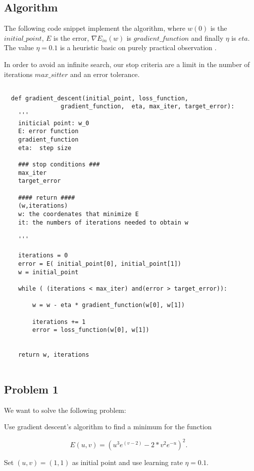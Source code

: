 \subsection{Algorithm}

The following code snippet implement the algorithm, where $w(0)$ is the $initial\_point$, $E$ is the error, $\nabla E_{in}(w)$ is $gradient\_function$ and
finally $\eta$ is $eta.$ The value $\eta = 0.1$ is a heuristic basic on purely practical observation \cite{LFD}.


In order to avoid an infinite search, our stop criteria are a limit in the number of iterations $max\_sitter$ and an error tolerance. 

\begin{verbatim} 

  def gradient_descent(initial_point, loss_function,
                gradient_function,  eta, max_iter, target_error):
    '''
    initicial point: w_0 
    E: error function 
    gradient_function
    eta:  step size 

    ### stop conditions ###
    max_iter
    target_error

    #### return ####
    (w,iterations)
    w: the coordenates that minimize E
    it: the numbers of iterations needed to obtain w
    
    '''

    iterations = 0
    error = E( initial_point[0], initial_point[1])
    w = initial_point
  
    while ( (iterations < max_iter) and(error > target_error)): 

        w = w - eta * gradient_function(w[0], w[1])
        
        iterations += 1
        error = loss_function(w[0], w[1])
 
    
    return w, iterations
        
\end{verbatim}

\subsection{Problem 1}

We want to solve the following problem: %

Use gradient descent's algorithm to find a minimum for the
function


\[E(u,v) = (u^3 e^{(v-2)} - 2* v^2 e^{-u})^2.\]

Set $(u,v)=(1,1)$ as initial point and use learning rate $\eta = 0.1$.

